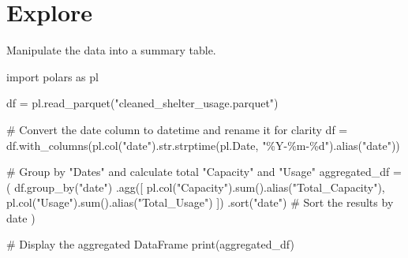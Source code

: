 \documentclass[
  letterpaper,
  DIV=11,
  numbers=noendperiod]{scrartcl}
\newenvironment{Shaded}{\begin{snugshade}}{\end{snugshade}}
\newcommand{\BuiltInTok}[1]{\textcolor[rgb]{0.00,0.23,0.31}{#1}}
\newcommand{\CommentTok}[1]{\textcolor[rgb]{0.37,0.37,0.37}{#1}}
\newcommand{\ImportTok}[1]{\textcolor[rgb]{0.00,0.46,0.62}{#1}}
\newcommand{\NormalTok}[1]{\textcolor[rgb]{0.00,0.23,0.31}{#1}}
\newcommand{\OperatorTok}[1]{\textcolor[rgb]{0.37,0.37,0.37}{#1}}
\newcommand{\SpecialCharTok}[1]{\textcolor[rgb]{0.37,0.37,0.37}{#1}}
\newcommand{\StringTok}[1]{\textcolor[rgb]{0.13,0.47,0.30}{#1}}
\begin{document}
\section{Explore}\label{explore}

Manipulate the data into a summary table.

\begin{Shaded}
\begin{Highlighting}[]
\ImportTok{import}\NormalTok{ polars }\ImportTok{as}\NormalTok{ pl}

\NormalTok{df }\OperatorTok{=}\NormalTok{ pl.read\_parquet(}\StringTok{"cleaned\_shelter\_usage.parquet"}\NormalTok{)}

\CommentTok{\# Convert the date column to datetime and rename it for clarity}
\NormalTok{df }\OperatorTok{=}\NormalTok{ df.with\_columns(pl.col(}\StringTok{"date"}\NormalTok{).}\BuiltInTok{str}\NormalTok{.strptime(pl.Date, }\StringTok{"\%Y{-}\%m{-}}\SpecialCharTok{\%d}\StringTok{"}\NormalTok{).alias(}\StringTok{"date"}\NormalTok{))}

\CommentTok{\# Group by "Dates" and calculate total "Capacity" and "Usage"}
\NormalTok{aggregated\_df }\OperatorTok{=}\NormalTok{ (}
\NormalTok{    df.group\_by(}\StringTok{"date"}\NormalTok{)}
\NormalTok{    .agg([}
\NormalTok{        pl.col(}\StringTok{"Capacity"}\NormalTok{).}\BuiltInTok{sum}\NormalTok{().alias(}\StringTok{"Total\_Capacity"}\NormalTok{),}
\NormalTok{        pl.col(}\StringTok{"Usage"}\NormalTok{).}\BuiltInTok{sum}\NormalTok{().alias(}\StringTok{"Total\_Usage"}\NormalTok{)}
\NormalTok{    ])}
\NormalTok{    .sort(}\StringTok{"date"}\NormalTok{)  }\CommentTok{\# Sort the results by date}
\NormalTok{)}

\CommentTok{\# Display the aggregated DataFrame}
\BuiltInTok{print}\NormalTok{(aggregated\_df)}
\end{Highlighting}
\end{Shaded}
\end{document}
